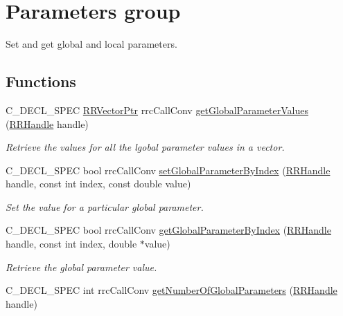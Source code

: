 \hypertarget{group__parameters}{\section{Parameters group}
\label{group__parameters}
}


Set and get global and local parameters.  


\subsection*{Functions}
\begin{DoxyCompactItemize}
\item 
C\-\_\-\-D\-E\-C\-L\-\_\-\-S\-P\-E\-C \hyperlink{rrc__types_8h_a3be72d6006034fd349f753d2bf441bf7}{R\-R\-Vector\-Ptr} rrc\-Call\-Conv \hyperlink{group__parameters_ga8786ef7925e23f93be3826e3bc1a7c73}{get\-Global\-Parameter\-Values} (\hyperlink{rrc__types_8h_a1d68f0592372208fa5a5f2799ea4b3ae}{R\-R\-Handle} handle)
\begin{DoxyCompactList}\small\item\em Retrieve the values for all the lgobal parameter values in a vector. \end{DoxyCompactList}\item 
C\-\_\-\-D\-E\-C\-L\-\_\-\-S\-P\-E\-C bool rrc\-Call\-Conv \hyperlink{group__parameters_ga3f4d3739191a328326e0de1f7c07334a}{set\-Global\-Parameter\-By\-Index} (\hyperlink{rrc__types_8h_a1d68f0592372208fa5a5f2799ea4b3ae}{R\-R\-Handle} handle, const int index, const double value)
\begin{DoxyCompactList}\small\item\em Set the value for a particular global parameter. \end{DoxyCompactList}\item 
C\-\_\-\-D\-E\-C\-L\-\_\-\-S\-P\-E\-C bool rrc\-Call\-Conv \hyperlink{group__parameters_gac2fed7cbeb8f0b2099f72f73de5dac36}{get\-Global\-Parameter\-By\-Index} (\hyperlink{rrc__types_8h_a1d68f0592372208fa5a5f2799ea4b3ae}{R\-R\-Handle} handle, const int index, double $\ast$value)
\begin{DoxyCompactList}\small\item\em Retrieve the global parameter value. \end{DoxyCompactList}\item 
C\-\_\-\-D\-E\-C\-L\-\_\-\-S\-P\-E\-C int rrc\-Call\-Conv \hyperlink{group__parameters_ga430bad38724b6db3feea39b31231e85e}{get\-Number\-Of\-Global\-Parameters} (\hyperlink{rrc__types_8h_a1d68f0592372208fa5a5f2799ea4b3ae}{R\-R\-Handle} handle)

\end{DoxyCompactItemize}
